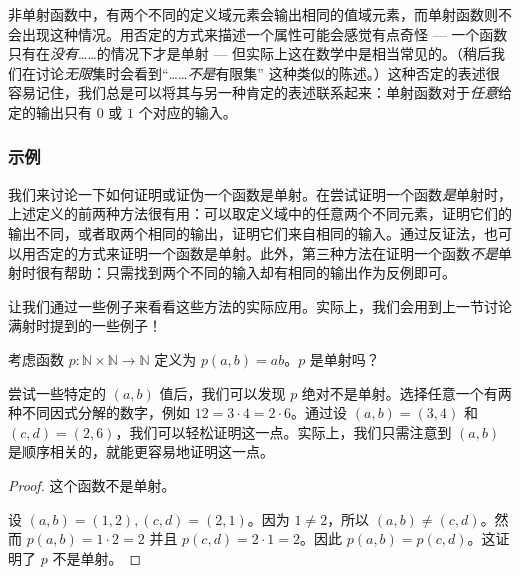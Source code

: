 \begin{multicols}{2}
\begin{center}
{}
    \end{center}
\end{multicols}

非单射函数中，有两个不同的定义域元素会输出相同的值域元素，而单射函数则不会出现这种情况。用否定的方式来描述一个属性可能会感觉有点奇怪 --- 一个函数只有在\emph{没有}……的情况下才是单射 --- 但实际上这在数学中是相当常见的。（稍后我们在讨论\emph{无限}集时会看到``……\emph{不是}有限集'' 这种类似的陈述。）这种否定的表述很容易记住，我们总是可以将其与另一种肯定的表述联系起来：单射函数对于\emph{任意}给定的输出只有 $0$ 或 $1$ 个对应的输入。

\subsubsection*{示例}

我们来讨论一下如何证明或证伪一个函数是单射。在尝试证明一个函数\emph{是}单射时，上述定义的前两种方法很有用：可以取定义域中的任意两个不同元素，证明它们的输出不同，或者取两个相同的输出，证明它们来自相同的输入。通过反证法，也可以用否定的方式来证明一个函数是单射。此外，第三种方法在证明一个函数\emph{不是}单射时很有帮助：只需找到两个不同的输入却有相同的输出作为反例即可。

让我们通过一些例子来看看这些方法的实际应用。实际上，我们会用到上一节讨论满射时提到的一些例子！\\

\begin{example}
    考虑函数 $p : \mathbb{N} \times \mathbb{N} \to \mathbb{N}$ 定义为 $p(a,b) = ab$。$p$ 是单射吗？

    尝试一些特定的 $(a, b)$ 值后，我们可以发现 $p$ 绝对不是单射。选择任意一个有两种不同因式分解的数字，例如 $12 = 3 \cdot 4 = 2 \cdot 6$。通过设 $(a, b) = (3, 4)$ 和 $(c, d) = (2, 6)$，我们可以轻松证明这一点。实际上，我们只需注意到 $(a, b)$ 是顺序相关的，就能更容易地证明这一点。

    \begin{proof}
        这个函数不是单射。

        设 $ (a, b) = (1, 2), (c, d) = (2, 1)$。因为 $1 \ne 2$，所以 $ (a, b) \ne (c, d)$。然而 $p(a, b) = 1 \cdot 2 = 2$ 并且 $p(c, d) = 2 \cdot 1 = 2$。因此 $p(a, b) = p(c, d)$。这证明了 $p$ 不是单射。
    \end{proof}
\end{example}


